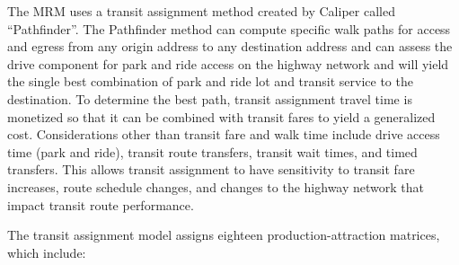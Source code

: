 \documentclass[
]{article}
\begin{document}
The MRM uses a transit assignment method created by Caliper called
``Pathfinder''. The Pathfinder method can compute specific walk paths
for access and egress from any origin address to any destination address
and can assess the drive component for park and ride access on the
highway network and will yield the single best combination of park and
ride lot and transit service to the destination. To determine the best
path, transit assignment travel time is monetized so that it can be
combined with transit fares to yield a generalized cost. Considerations
other than transit fare and walk time include drive access time (park
and ride), transit route transfers, transit wait times, and timed
transfers. This allows transit assignment to have sensitivity to transit
fare increases, route schedule changes, and changes to the highway
network that impact transit route performance.

The transit assignment model assigns eighteen production-attraction
matrices, which include:
\end{document}
